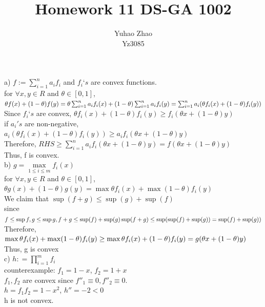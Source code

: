 \documentclass[11pt]{article}
\newenvironment{problem}[2][Problem]{\begin{trivlist}
\item[\hskip \labelsep {\bfseries #1}\hskip \labelsep {\bfseries #2.}]}{\end{trivlist}}
\begin{document}
 
 
\title{Homework 11 DS-GA 1002 }%
\author{Yuhao Zhao\\ %
Yz3085} %
\maketitle

\begin{problem}{1}
\end{problem}
a) $f := \sum_{i = 1}^{n} a_if_i$ and $f_i‘s$ are convex functions. \\
for $\forall x,y \in R $ and $\theta \in [0,1]$, $\theta f(x)+ (1-\theta)f(y) =\theta \sum_{i = 1}^{n} a_if_i(x) +(1-\theta) \sum_{i = 1}^{n} a_if_i(y) \\ = \sum_{i = 1}^{n}  a_i(\theta f_i(x) + (1- \theta)f_i(y))$ \\ Since $f_i‘s$ are convex, $\theta f_i(x) + (1- \theta)f_i(y) \geq f_i(\theta x + (1-\theta)y)$\\
if $a_i's$ are non-negative, $a_i(\theta f_i(x) + (1- \theta)f_i(y)) \geq a_i f_i(\theta x + (1-\theta)y)$\\
Therefore, $RHS \geq \sum_{i = 1}^{n} a_i f_i(\theta x + (1-\theta)y) = f(\theta x + (1-\theta)y)$\\
Thus, f is convex.\\

b) $g = \max\limits_{1\leq i \leq m} f_i(x)$\\
for $\forall x,y \in R $ and $\theta \in [0,1]$, $\theta g(x) + (1- \theta)g(y) = \max \theta f_i(x) + \max  (1 - \theta) f_i(y)$\\
We claim that $\sup (f+ g) \leq \sup (g) +\sup (f)$\\
since $f\leq \sup  f, g\leq \sup  g, f+g \leq \sup (f) +\sup (g)\\\sup (f + g) \leq \sup (\sup (f)+\sup (g)) = \sup (f) +\sup (g))$\\
Therefore, $\max \theta f_i(x) + \max  (1 - \theta) f_i(y) \geq \max \theta f_i(x)  +   (1 - \theta) f_i(y) = g(\theta x+ (1 - \theta)y) \\$
Thus, g is convex\\

c) $h: = \prod_{i =1}^{m} f_i$\\
counterexample: $f_1 = 1-x$, $f_2 = 1+x$\\
$f_1,f_2 $ are convex since $f''_1 \equiv 0 , f''_2 \equiv 0.$\\
$ h= f_1f_2 = 1- x^2$, $h'' = -2 <0$\\
h is not convex.\\
\end{document}
